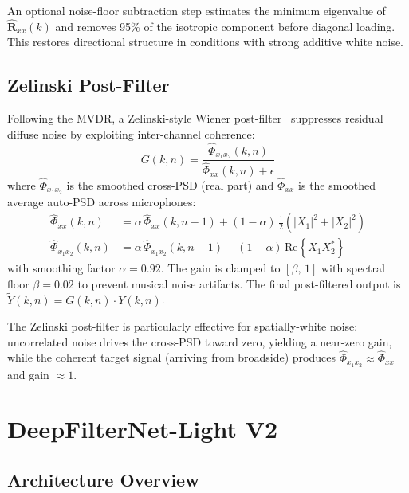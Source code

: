 \documentclass[a4paper]{article}
\begin{document}
An optional noise-floor subtraction step estimates the minimum eigenvalue of
$\hat{\mathbf{R}}_{xx}(k)$ and removes 95\% of the isotropic component before
diagonal loading.  This restores directional structure in conditions with
strong additive white noise.

\subsection{Zelinski Post-Filter}
\label{sec:pf}

Following the MVDR, a Zelinski-style Wiener post-filter~\cite{zelinski1988postfilter,simmer2001postfilter}
suppresses residual diffuse noise by exploiting inter-channel coherence:
\begin{equation}
G(k,n) = \frac{\hat{\Phi}_{x_1 x_2}(k,n)}{\hat{\Phi}_{xx}(k,n) + \epsilon}
\label{eq:zelinski}
\end{equation}
where $\hat{\Phi}_{x_1 x_2}$ is the smoothed cross-PSD (real part) and
$\hat{\Phi}_{xx}$ is the smoothed average auto-PSD across microphones:
\begin{align}
\hat{\Phi}_{xx}(k,n) &= \alpha\,\hat{\Phi}_{xx}(k,n\!-\!1)
  + (1\!-\!\alpha)\,\tfrac{1}{2}\!\left(|X_1|^2+|X_2|^2\right) \\
\hat{\Phi}_{x_1 x_2}(k,n) &= \alpha\,\hat{\Phi}_{x_1 x_2}(k,n\!-\!1)
  + (1\!-\!\alpha)\,\text{Re}\!\left\{X_1 X_2^*\right\}
\end{align}
with smoothing factor $\alpha=0.92$.  The gain is clamped to $[\beta,\,1]$
with spectral floor $\beta=0.02$ to prevent musical noise artifacts.  The
final post-filtered output is $\tilde{Y}(k,n)=G(k,n)\cdot Y(k,n)$.

The Zelinski post-filter is particularly effective for spatially-white noise:
uncorrelated noise drives the cross-PSD toward zero, yielding a near-zero
gain, while the coherent target signal (arriving from broadside) produces
$\hat{\Phi}_{x_1 x_2}\approx\hat{\Phi}_{xx}$ and gain $\approx\!1$.

\section{DeepFilterNet-Light V2}
\label{sec:dnn}

\subsection{Architecture Overview}
\label{sec:dnn_arch}
\end{document}
